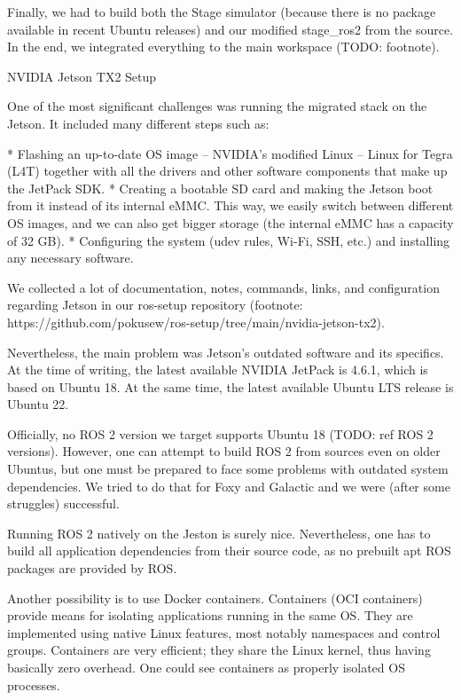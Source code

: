 Finally, we had to build both the Stage simulator (because there is no package available in recent Ubuntu releases) and our modified stage_ros2 from the source. In the end, we integrated everything to the main workspace (TODO: footnote).


\secc NVIDIA Jetson TX2 Setup

One of the most significant challenges was running the migrated stack on the Jetson. It included many different steps such as:

\begitems
* Flashing an up-to-date OS image – NVIDIA's modified Linux – Linux for Tegra (L4T) together with all the drivers and other software components that make up the JetPack SDK.
* Creating a bootable SD card and making the Jetson boot from it instead of its internal eMMC. This way, we easily switch between different OS images, and we can also get bigger storage (the internal eMMC has a capacity of 32 GB).
* Configuring the system (udev rules, Wi-Fi, SSH, etc.) and installing any necessary software.
\enditems

We collected a lot of documentation, notes, commands, links, and configuration regarding Jetson in our ros-setup repository (footnote: https://github.com/pokusew/ros-setup/tree/main/nvidia-jetson-tx2).

Nevertheless, the main problem was Jetson's outdated software and its specifics. At the time of writing, the latest available NVIDIA JetPack is 4.6.1, which is based on Ubuntu 18. At the same time, the latest available Ubuntu LTS release is Ubuntu 22.

Officially, no ROS 2 version we target supports Ubuntu 18 (TODO: ref ROS 2 versions). However, one can attempt to build ROS 2 from sources even on older Ubuntus, but one must be prepared to face some problems with outdated system dependencies. We tried to do that for Foxy and Galactic and we were (after some struggles) successful.

Running ROS 2 natively on the Jeston is surely nice. Nevertheless, one has to build all application dependencies from their source code, as no prebuilt apt ROS packages are provided by ROS.

Another possibility is to use Docker containers. Containers (OCI containers) provide means for isolating applications running in the same OS. They are implemented using native Linux features, most notably namespaces and control groups. Containers are very efficient; they share the Linux kernel, thus having basically zero overhead. One could see containers as properly isolated OS processes.


